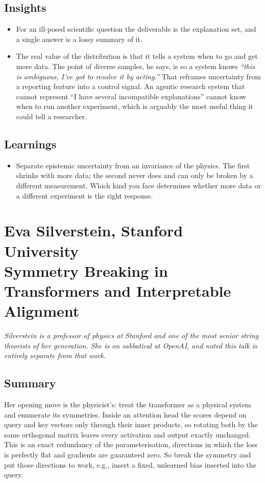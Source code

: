 \documentclass[11pt]{article}
\begin{document}
\subsection*{Insights}
\begin{itemize}
    \item For an ill-posed scientific question the deliverable is the explanation set, and a single answer is a lossy summary of it.
    \item The real value of the distribution is that it tells a system when to go and get more data. The point of diverse samples, he says, is so a system knows \emph{``this is ambiguous, I've got to resolve it by acting.''} That reframes uncertainty from a reporting feature into a control signal. An agentic research system that cannot represent ``I have several incompatible explanations'' cannot know when to run another experiment, which is arguably the most useful thing it could tell a researcher.
\end{itemize}

\subsection*{Learnings}
\begin{itemize}
    \item Separate epistemic uncertainty from an invariance of the physics. The first shrinks with more data; the second never does and can only be broken by a different measurement. Which kind you face determines whether more data or a different experiment is the right response.
\end{itemize}

\section{Eva Silverstein, Stanford University\\
{\large Symmetry Breaking in Transformers and Interpretable Alignment}}

\emph{Silverstein is a professor of physics at Stanford and one of the most senior string theorists of her generation. She is on sabbatical at OpenAI, and noted this talk is entirely separate from that work.}

\subsection*{Summary}
Her opening move is the physicist's: treat the transformer as a physical system and enumerate its symmetries. Inside an attention head the scores depend on query and key vectors only through their inner products, so rotating both by the same orthogonal matrix leaves every activation and output exactly unchanged. This is an exact redundancy of the parameterisation, directions in which the loss is perfectly flat and gradients are guaranteed zero. So break the symmetry and put those directions to work, e.g., insert a fixed, unlearned bias inserted into the query.
\end{document}
